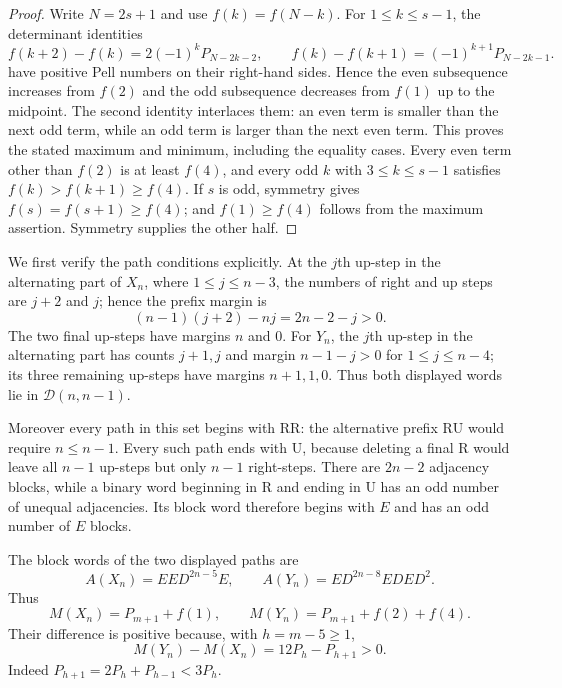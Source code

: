 \documentclass[11pt]{amsart}
\theoremstyle{definition}
\newcommand{\RR}{\mathrm{R}}
\newcommand{\UU}{\mathrm{U}}
\newcommand{\cD}{\mathcal D}
\begin{document}
\begin{proof}
Write $N=2s+1$ and use $f(k)=f(N-k)$.  For
$1\leq k\leq s-1$, the determinant identities
\[
 f(k+2)-f(k)=2(-1)^kP_{N-2k-2},\qquad
 f(k)-f(k+1)=(-1)^{k+1}P_{N-2k-1}.
\]
have positive Pell numbers on their right-hand sides.  Hence the even
subsequence increases from $f(2)$ and the odd subsequence decreases from
$f(1)$ up to the midpoint.  The second identity interlaces them: an even term
is smaller than the next odd term, while an odd term is larger than the next
even term.  This proves the stated maximum and minimum, including the equality
cases.  Every even term other than $f(2)$ is at least $f(4)$, and every
odd $k$ with $3\leq k\leq s-1$ satisfies
$f(k)>f(k+1)\geq f(4)$.  If $s$ is odd, symmetry gives
$f(s)=f(s+1)\geq f(4)$; and $f(1)\geq f(4)$ follows from the maximum
assertion.  Symmetry supplies the other half.
\end{proof}

We first verify the path conditions explicitly.  At the $j$th up-step in the
alternating part of $X_n$, where $1\leq j\leq n-3$, the numbers of right and up
steps are $j+2$ and $j$; hence the prefix margin is
\[
 (n-1)(j+2)-nj=2n-2-j>0.
\]
The two final up-steps have margins $n$ and $0$.  For $Y_n$, the $j$th up-step
in the alternating part has counts $j+1,j$ and margin $n-1-j>0$ for
$1\leq j\leq n-4$; its three remaining up-steps have margins $n+1,1,0$.
Thus both displayed words lie in $\cD(n,n-1)$.

Moreover every path in this set begins with $\RR\RR$: the alternative prefix
$\RR\UU$ would require $n\leq n-1$.  Every such path ends with $\UU$, because
deleting a final $\RR$ would leave all $n-1$ up-steps but only $n-1$ right-steps.
There are $2n-2$ adjacency blocks, while a binary word beginning in $\RR$ and
ending in $\UU$ has an odd number of unequal adjacencies.  Its block word
therefore begins with $E$ and has an odd number of $E$ blocks.

The block words of the two displayed paths are
\[
 A(X_n)=EED^{2n-5}E,\qquad
 A(Y_n)=ED^{2n-8}EDED^2.
\]
Thus
\[
 M(X_n)=P_{m+1}+f(1),\qquad
 M(Y_n)=P_{m+1}+f(2)+f(4).
\]
Their difference is positive because, with $h=m-5\geq1$,
\[
 M(Y_n)-M(X_n)=12P_h-P_{h+1}>0.
\]
Indeed $P_{h+1}=2P_h+P_{h-1}<3P_h$.
\end{document}
